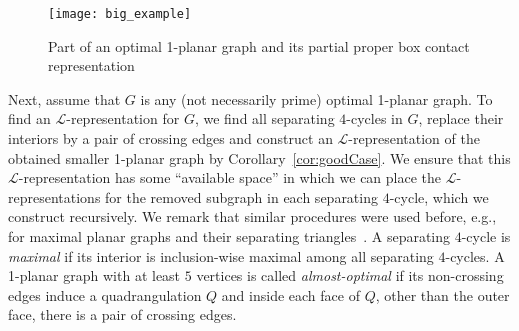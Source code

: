 \documentclass{article}
\newcommand{\df}{\textit}
\newcommand{\LL}{$\mathcal{L}$\xspace}
\begin{document}
\begin{figure}[htb]
 \centering
 \texttt{[image: big\_example]}
 \caption{Part of an optimal 1-planar graph and its partial proper box contact representation}
 \label{fig:big_example}
\end{figure}




Next, assume that $G$ is any (not necessarily prime) optimal 1-planar graph.
To find an \LL-representation for $G$, we find all separating $4$-cycles in $G$, replace their interiors by a pair of crossing edges and construct an \LL-representation of the obtained smaller 1-planar graph by Corollary~\ref{cor:goodCase}.
We ensure that this \LL-representation has some ``available space'' in which we can place the \LL-representations for the removed subgraph in each separating $4$-cycle, which we construct recursively.
We remark that similar procedures were used before, e.g., for maximal planar graphs and their separating triangles~\cite{FF11,Tho88}.
A separating $4$-cycle is \df{maximal} if its interior is inclusion-wise maximal among all separating $4$-cycles.
A 1-planar graph with at least $5$ vertices is called \df{almost-optimal} if its non-crossing edges induce a quadrangulation $Q$ and inside each face of $Q$, other than the outer face, there is a pair of crossing edges.





\newcommand{\lt}{\textbf{Let} }
\newcommand{\drawOpt}{algorithm \textbf{L-Contact}}
\end{document}
